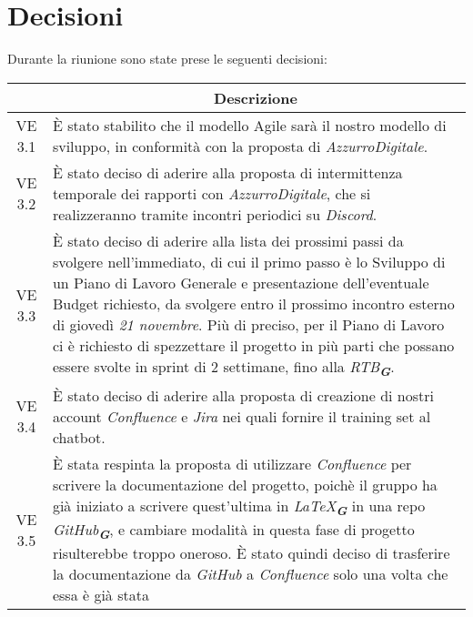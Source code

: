

\section{Decisioni}

Durante la riunione sono state prese le seguenti decisioni:

\vspace{0.5cm}

\begin{table}[htbp]
    \centering
    \begin{tabular}{|c|p{}|}
        \hline
        \rowcolor[gray]{0.75}
        \multicolumn{1}{|c|}{\textbf{Codice}} & \multicolumn{1}{|c|}{\textbf{Descrizione}}\\
        \hline
        VE 3.1 & È stato stabilito che il modello Agile sarà il nostro modello di sviluppo, in conformità con la proposta di \emph{AzzurroDigitale}. \\
        \hline
        VE 3.2 & È stato deciso di aderire alla proposta di intermittenza temporale dei rapporti con \emph{AzzurroDigitale}, che si realizzeranno tramite incontri periodici 
        su \emph{Discord}. \\
        \hline
        VE 3.3 & È stato deciso di aderire alla lista dei prossimi passi da svolgere nell'immediato, di cui il primo passo è lo Sviluppo di un Piano di Lavoro
        Generale e presentazione dell'eventuale Budget richiesto, da svolgere entro il prossimo incontro esterno di giovedì \emph{21 novembre}. Più di
        preciso, per il Piano di Lavoro ci è richiesto di spezzettare il progetto in più parti che possano essere svolte in sprint di 2 settimane, fino alla
        \emph{RTB}\textsubscript{\textit{\textbf{G}}}. \\
        \hline
        VE 3.4 & È stato deciso di aderire alla proposta di creazione di nostri account \emph{Confluence} e \emph{Jira} nei quali fornire il training set 
        al chatbot. \\
        \hline
        VE 3.5 & È stata respinta la proposta di utilizzare \emph{Confluence} per scrivere la documentazione del progetto, poichè il gruppo ha già iniziato a scrivere
        quest'ultima in \emph{\LaTeX}\textsubscript{\textit{\textbf{G}}} in una repo \emph{GitHub}\textsubscript{\textit{\textbf{G}}}, e cambiare modalità in questa fase
        di progetto risulterebbe troppo oneroso. È stato quindi deciso di trasferire la documentazione da \emph{GitHub} a \emph{Confluence} solo una volta che essa è già stata

\end{tabular}
\end{table}
